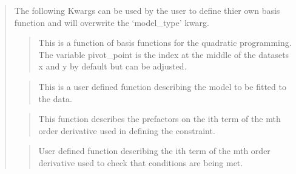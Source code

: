 \documentclass[letterpaper,10pt,english]{sphinxmanual}
\begin{document}
\begin{fulllineitems}
\begin{quote}
\begin{description}
\end{description}

The following Kwargs can be used by the user to define thier own basis
function and will overwrite the ‘model\_type’ kwarg.

\begin{quote}

\begin{DUlineblock}{0em}
\item[] This is a function of basis functions
for the quadratic programming. The variable pivot\_point is the
index at the middle of the datasets x and y by default but can
be adjusted.
\end{DUlineblock}
\end{quote}

\begin{quote}

\begin{DUlineblock}{0em}
\item[] This is
a user defined function describing the model to be fitted to the
data.
\end{DUlineblock}
\end{quote}

\begin{quote}

\begin{DUlineblock}{0em}
\item[] This function describes the prefactors on the ith term of the mth
order derivative used in defining the constraint.
\end{DUlineblock}
\end{quote}

\begin{quote}

\begin{DUlineblock}{0em}
\item[] User defined function describing the ith term of the mth
order derivative used to check that conditions are being met.
\end{DUlineblock}
\end{quote}
\begin{description}
\item[{}] \leavevmode
{}


\end{description}
\end{quote}
\end{fulllineitems}
\end{document}
